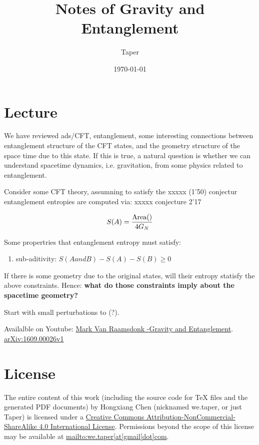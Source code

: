 \documentclass{article}
\title{Notes of Gravity and Entanglement}
\date{\today}
\author{Taper}
\numberwithin{equation}{subsection} %
\theoremstyle{definition}
\begin{document}
\maketitle
{}
\tableofcontents

\section{Lecture}
\label{sec:Lecture}

We have reviewed ads/CFT, entanglement, some interesting connections
between entanglement structure of the CFT states, and the geometry
structure of the space time due to this state. If this is true, a natural
question is whether we can understand spacetime dynamics, i.e. gravitation,
from some physics related to entanglement.

Consider some CFT theory, assumning to satisfy the xxxxx (1'50) conjectur 
entanglement entropies are computed via:
xxxxx conjecture
2'17

\begin{align}
    S(A) = \frac{\text{Area}(\title{A})}{4G_N}
\end{align}

Some propertries that entanglement entropy must satisfy:
\begin{enumerate}
    \item sub-aditivity: $S(A and B)-S(A)-S(B) \geq 0$
\end{enumerate}
If there is some geometry due to the original states, will their entropy
statisfy the above constraints. Hence: \textbf{what do those constraints imply about
the spacetime geometry?}

Start with small perturbations to (?). 
\begin{thebibliography}{1}
     Availalble on Youtube: \href{https://www.youtube.com/watch?v=ABJvMg5d9OY}{Mark Van Raamsdonk -Gravity and Entanglement}.
     \href{http://arxiv.org/abs/1609.00026v1}{arXiv:1609.00026v1}
\end{thebibliography}
\printnomenclature
\section{License}
The entire content of this work (including the source code
for TeX files and the generated PDF documents) by 
Hongxiang Chen (nicknamed we.taper, or just Taper) is
licensed under a 
\href{http://creativecommons.org/licenses/by-nc-sa/4.0/}{Creative 
Commons Attribution-NonCommercial-ShareAlike 4.0 International 
License}. Permissions beyond the scope of this 
license may be available at \url{mailto:we.taper[at]gmail[dot]com}.
\end{document}
